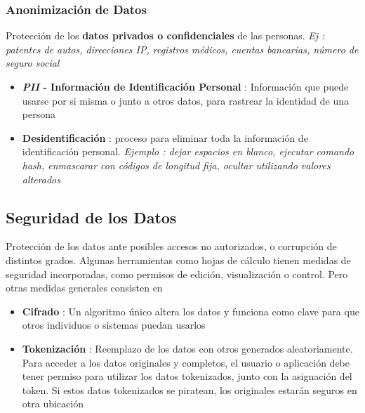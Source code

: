 \subsubsection{Anonimización de Datos}
Protección de los \textbf{datos privados o confidenciales} de las personas. \textit{Ej : patentes de autos, direcciones IP, registros médicos, cuentas bancarias, número de seguro social}
\begin{itemize}
    \item {\textbf{\textit{PII} - Información de Identificación Personal} : Información que puede usarse por si misma o junto a otros datos, para rastrear la identidad de una persona}
    \item {\textbf{Desidentificación} : proceso para eliminar toda la información de identificación personal. \textit{Ejemplo : dejar espacios en blanco, ejecutar comando hash, enmascarar con códigos de longitud fija, ocultar utilizando valores alterados}}
\end{itemize}

\subsection{Seguridad de los Datos}
Protección de los datos ante posibles accesos no autorizados, o corrupción de distintos grados. Algunas herramientas como hojas de cálculo tienen medidas de seguridad incorporadas, como permisos de edición, visualización o control. Pero otras medidas generales consisten en
\begin{itemize}
    \item {\textbf{Cifrado} : Un algoritmo único altera los datos y funciona como clave para que otros individuos o sistemas puedan usarlos}
    \item {\textbf{Tokenización} : Reemplazo de los datos con otros generados aleatoriamente. Para acceder a los datos originales y completos, el usuario o aplicación debe tener permiso para utilizar los datos tokenizados, junto con la asignación del token. Si estos datos tokenizados se piratean, los originales estarán seguros en otra ubicación}
\end{itemize}



\newpage